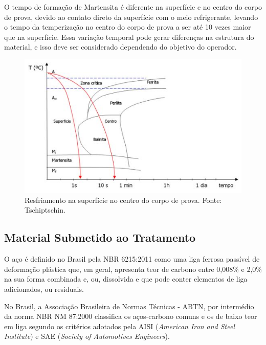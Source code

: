 O tempo de formação de Martensita é diferente na superfície e no centro do corpo de prova, devido ao contato direto da superfície com o meio refrigerante, levando o tempo da temperização no centro do corpo de prova a ser até 10 vezes maior que na superfície. Essa variação temporal pode gerar diferenças na estrutura do material, e isso deve ser considerado dependendo do objetivo do operador.

\begin{figure}[!ht]
	\centering
	\label{resfriamento2}
	\includegraphics[keepaspectratio=true,scale=0.8]{figuras/resfriamento2.JPG}
	\caption{Resfriamento na superfície no centro do corpo de prova. Fonte: Tschiptschin.}
\end{figure}

\subsection{Material Submetido ao Tratamento}

O aço é definido no Brasil pela NBR 6215:2011 como uma liga ferrosa passível de deformação plástica que, em geral, apresenta teor de carbono entre 0,008\% e 2,0\% na sua forma combinada e, ou, dissolvida e que pode conter elementos de liga adicionados, ou residuais.

No Brasil, a Associação Brasileira de Normas Técnicas - ABTN, por intermédio da norma NBR NM 87:2000 classifica os aços-carbono comuns e os de baixo teor em liga segundo os critérios adotados pela AISI (\textit{American Iron and Steel Institute}) e SAE (\textit{Society of Automotives Engineers}).

